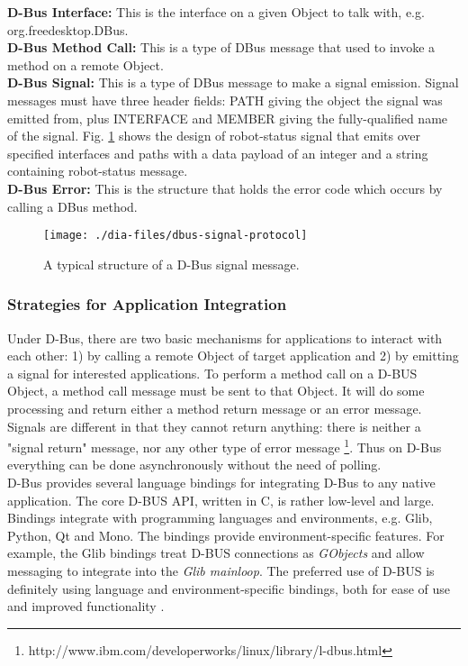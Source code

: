 \textbf{D-Bus Interface: }
This is the interface on a given Object to talk with, e.g. org.freedesktop.DBus.\\
\textbf{D-Bus Method Call: }
This is a type of DBus message that used to invoke a method on a remote Object.\\
\textbf{D-Bus Signal: }
This is a type of DBus message to make a signal emission. Signal messages must have three header fields: PATH giving the object the signal was emitted from, plus INTERFACE and MEMBER giving the fully-qualified name of the signal. Fig. \ref{fig:dbus-signal-protocol} shows the design of robot-status signal that emits over specified interfaces and paths with a data payload of an integer and a string containing robot-status message.\\
\textbf{D-Bus Error: }
This is the structure that holds the error code which occurs by calling a DBus method.
\begin{figure}
\begin{center}
\texttt{[image: ./dia-files/dbus-signal-protocol]} 
\caption{A typical structure of a D-Bus signal message.} 
\label{fig:dbus-signal-protocol}
\end{center}
\end{figure}
\subsubsection*{Strategies for Application Integration}
Under D-Bus, there are two basic mechanisms for applications to interact with each other: 1) by calling a remote Object of target application and 2) by emitting a signal for interested applications. To perform a method call on a D-BUS Object, a method call message must be sent to that Object. It will do some processing and return either a method return message or an error message. Signals are different in that they cannot return anything: there is neither a "signal return" message, nor any other type of error message \footnote{http://www.ibm.com/developerworks/linux/library/l-dbus.html}. Thus on D-Bus everything can be done asynchronously without the need of polling.\\ 
D-Bus provides several language bindings for integrating D-Bus to any native application. The core D-BUS API, written in C, is rather low-level and large. Bindings integrate with programming languages and environments, e.g. Glib, Python, Qt and Mono. The bindings provide environment-specific features. For example, the Glib bindings treat D-BUS connections as {\em GObjects} and allow messaging to integrate into the {\em Glib mainloop}. The preferred use of D-BUS is definitely using language and environment-specific bindings, both for ease of use and improved functionality \cite{Love2005}.

